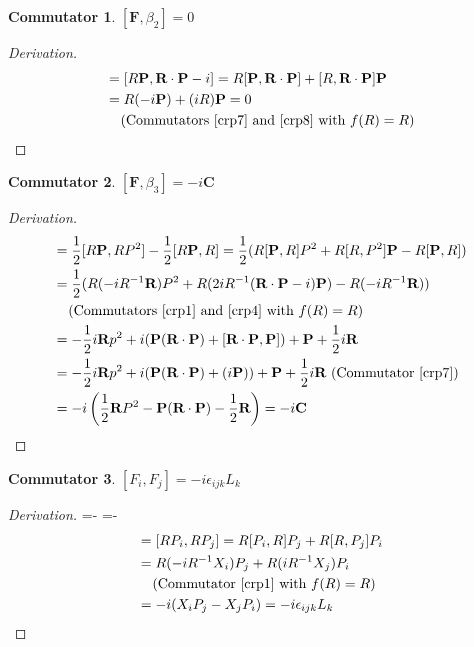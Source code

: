 \documentclass[12pt,a4paper]{report}
\theoremstyle{definition}
\newtheorem{commutator}{Commutator}[section]
\newenvironment{derivation}
  {\renewcommand\qedsymbol{$\square$}\begin{proof}[Derivation]}
  {\end{proof}}
\theoremstyle{remark}
\theoremstyle{remark}
\begin{document}
\begin{appendices}
\begin{commutator}\label{cf5}
$[\textbf{F},\beta_2]=0$
\end{commutator}
\begin{derivation}
\begin{align*}
[\textbf{F},\beta_2]&=[R\textbf{P},\textbf{R}\cdot\textbf{P}-i]=R[\textbf{P},\textbf{R}\cdot\textbf{P}]+[R,\textbf{R}\cdot\textbf{P}]\textbf{P}\\
&=R(-i\textbf{P})+(iR)\textbf{P}=0\\
&\phantom{=} \text{ (Commutators~\ref{crp7} and~\ref{crp8} with }f(R)=R)
\end{align*}
\end{derivation}

\begin{commutator}\label{cf6}
$[\textbf{F},\beta_3]=-i\textbf{C}$
\end{commutator}
\begin{derivation}
\begin{align*}
[\textbf{F},\beta_3]&=\frac{1}{2}[R\textbf{P},RP^2]-\frac{1}{2}[R\textbf{P},R]=\frac{1}{2}(R[\textbf{P},R]P^2+R[R,P^2]\textbf{P}-R[\textbf{P},R])\\
&=\frac{1}{2}(R(-iR^{-1}\textbf{R})P^2+R(2iR^{-1}(\textbf{R}\cdot\textbf{P}-i)\textbf{P})-R(-iR^{-1}\textbf{R}))\\
&\phantom{=}\text{ (Commutators~\ref{crp1} and~\ref{crp4} with }f(R)=R)\\
&=-\frac{1}{2}i\textbf{R}p^2+i(\textbf{P}(\textbf{R}\cdot\textbf{P})+[\textbf{R}\cdot\textbf{P},\textbf{P}])+\textbf{P}+\frac{1}{2}i\textbf{R}\\
&=-\frac{1}{2}i\textbf{R}p^2+i(\textbf{P}(\textbf{R}\cdot\textbf{P})+(i\textbf{P}))+\textbf{P}+\frac{1}{2}i\textbf{R} \text{ (Commutator~\ref{crp7})}\\
&=-i\left(\frac{1}{2}\textbf{R}P^2-\textbf{P}(\textbf{R}\cdot\textbf{P})-\frac{1}{2}\textbf{R}\right)=-i\textbf{C}
\end{align*}
\end{derivation}

\begin{commutator}\label{cf7}
$[F_i,F_j]=-i\epsilon_{ijk}L_k$
\end{commutator}
\begin{derivation}
\abovedisplayskip=-\baselineskip
\belowdisplayskip=0pt
\abovedisplayshortskip=-\baselineskip
\belowdisplayshortskip=0pt
\begin{align*}
[F_i,F_j]&=[RP_i,RP_j]=R[P_i,R]P_j+R[R,P_j]P_i\\
&=R(-iR^{-1}X_i)P_j+R(iR^{-1}X_j)P_i\\
&\phantom{=} \text{ (Commutator~\ref{crp1} with }f(R)=R)\\
&=-i(X_iP_j-X_jP_i)=-i\epsilon_{ijk}L_k
\end{align*}
\end{derivation}



\end{appendices}
\end{document}
